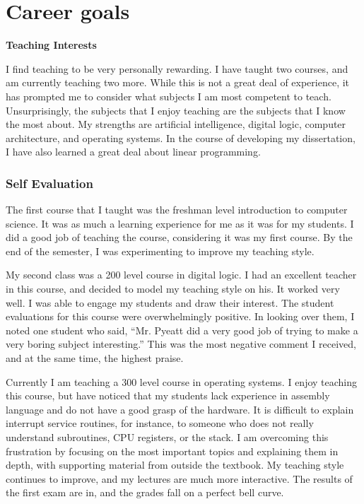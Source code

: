 \documentclass[11pt]{article}
\begin{document}
\section*{Career goals}


\centerline{\large\bf Teaching Interests}
\vspace{\baselineskip}

I find teaching to be very personally rewarding.  I have taught two
courses, and am currently teaching two more.  While this is not a
great deal of experience, it has prompted me to consider what
subjects I am most competent to teach.  Unsurprisingly, the subjects
that I enjoy teaching are the subjects that I know the most about.
My strengths are artificial intelligence, digital logic, computer
architecture, and operating systems.  In the course of developing my
dissertation, I have also learned a great deal about linear
programming.

\subsubsection*{Self Evaluation}

The first course that I taught was the freshman level introduction
to computer science.  It was as much a learning experience for me as
it was for my students.  I did a good job of teaching the course,
considering it was my first course.  By the end of the semester,
I was experimenting to improve my teaching style.


My second class was a 200 level course in digital logic.  I had an
excellent teacher in this course, and decided to model my teaching
style on his.  It worked very well.  I was able to engage my
students and draw their interest.  The student evaluations for this
course were overwhelmingly positive.  In looking over them, I noted
one student who said, ``Mr. Pyeatt did a very good job of trying to
make a very boring subject interesting.''  This was the most
negative comment I received, and at the same time, the highest
praise.

Currently I am teaching a 300 level course in operating systems.  I
enjoy teaching this course, but have noticed that my students lack
experience in assembly language and do not have a good grasp of the
hardware.  It is difficult to explain interrupt service routines,
for instance, to someone who does not really understand subroutines,
CPU registers, or the stack. I am overcoming this frustration by
focusing on the most important topics and explaining them in depth,
with supporting material from outside the textbook.  My teaching
style continues to improve, and my lectures are much more
interactive.  The results of the first exam are in, and the grades
fall on a perfect bell curve.
\end{document}
